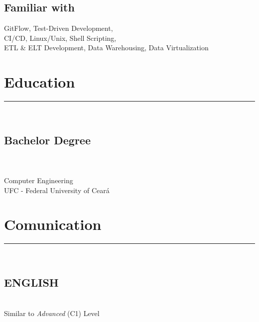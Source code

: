 \documentclass[]{rahulworld-resume}
\begin{document}
\begin{minipage}[t]{0.33\textwidth}
\subsection{Familiar with}
GitFlow, Test-Driven Development,\\
CI/CD, Linux/Unix, Shell Scripting,\\ETL \& ELT Development,
Data Warehousing, Data Virtualization
\vspace{7pt}

\sectionsep

\section{Education}
\noindent\rule{5cm}{0.4pt}\\

\subsection{Bachelor Degree}\\
 \\
Computer Engineering \\
UFC - Federal University of Ceará \\
\vspace{8pt}

\sectionsep

\section{Comunication}
\noindent\rule{5cm}{0.4pt}\\

\subsection{ENGLISH}\\
Similar to \textit{Advanced} (C1) Level
\vspace{8pt}

\sectionsep
%
%

\end{minipage}
\hfill
\end{document}
